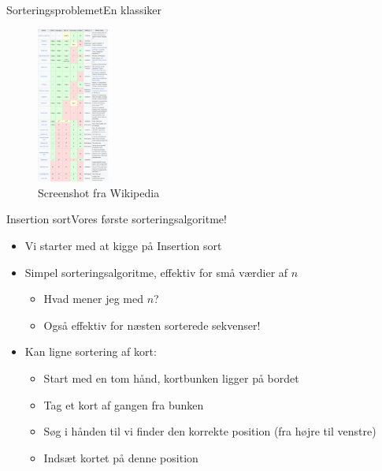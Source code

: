 \documentclass[aspectratio=1610]{beamer}
\begin{document}
\begin{frame}{Sorteringsproblemet}{En klassiker}
    \begin{figure}[h]
        \centering
        \includegraphics[width=0.21\textwidth]{sorting-algorithms-wiki}
        \caption{Screenshot fra Wikipedia}
        \label{fig:sorting-algorithms-wiki}
    \end{figure}
\end{frame}

\begin{frame}{Insertion sort}{Vores første sorteringsalgoritme!}
    \begin{itemize}[<+->]
        \item Vi starter med at kigge på \alert{Insertion sort}
        \item Simpel sorteringsalgoritme, effektiv for små værdier af $n$
            \begin{itemize}
                \item Hvad mener jeg med $n$?
                \item Også effektiv for \alert{næsten sorterede} sekvenser!
            \end{itemize}
        \item Kan ligne sortering af kort:
            \begin{itemize}
                \item Start med en tom hånd, kortbunken ligger på bordet
                \item Tag et kort af gangen fra bunken
                \item Søg i hånden til vi finder den korrekte position (fra
                    højre til venstre)
                \item Indsæt kortet på denne position
            \end{itemize}
    \end{itemize}
\end{frame}
\end{document}
